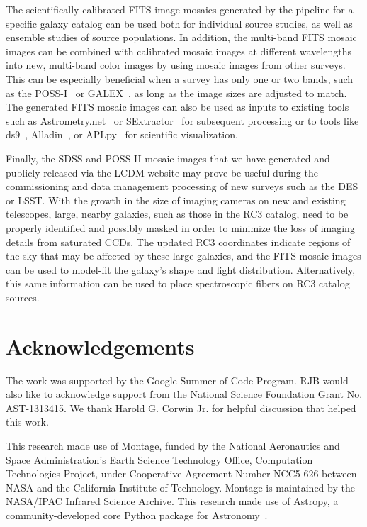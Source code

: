 \documentclass[authoryear, 12pt, 5p, times]{elsarticle}
\begin{document}
The scientifically calibrated FITS image mosaics generated by the pipeline for a specific galaxy catalog can be used both for individual source studies, as well as ensemble studies of source populations. In addition, the multi-band FITS mosaic images can be combined with calibrated mosaic images at different wavelengths into new, multi-band color images by using mosaic images from other surveys. This can be especially beneficial when a survey has only one or two bands, such as the POSS-I~\citep{poss1} or GALEX~\citep{galex}, as long as the image sizes are adjusted to match. The generated FITS mosaic images can also be used as inputs to
existing tools such as Astrometry.net~\citep{astrometry.net} or SExtractor~\citep{sextractor} for subsequent processing or to tools like ds9~\citep{ds9}, Alladin~\citep{aladin}, or APLpy~\citep{aplpy} for scientific visualization.

Finally, the SDSS and POSS-II mosaic images that we have generated and publicly released via the LCDM website may prove be useful during the commissioning and data management processing of new surveys such as the DES or LSST. With the growth in the size of  imaging cameras on new and existing telescopes, large, nearby galaxies, such as those in the RC3 catalog, need to be properly identified and possibly masked in order to minimize the loss of imaging details from saturated CCDs. The updated RC3 coordinates indicate regions of the sky that may be affected by these large galaxies, and the FITS mosaic images can be used to model-fit the galaxy's shape and light distribution. Alternatively, this same information can be used to place spectroscopic fibers on RC3 catalog sources. 

\section*{Acknowledgements}
\footnotesize

The work was supported by the Google Summer of Code Program. RJB would also like to acknowledge support from the National Science Foundation Grant No. AST-1313415. We thank Harold G. Corwin Jr. for helpful discussion that helped this work. 

This research made use of Montage, funded by the National Aeronautics and Space Administration's Earth Science Technology Office, Computation Technologies Project, under Cooperative Agreement Number NCC5-626 between NASA and the California Institute of Technology. Montage is maintained by the NASA/IPAC Infrared Science Archive. This research made use of Astropy, a community-developed core Python package for Astronomy~\citep{astropy}.
\end{document}
